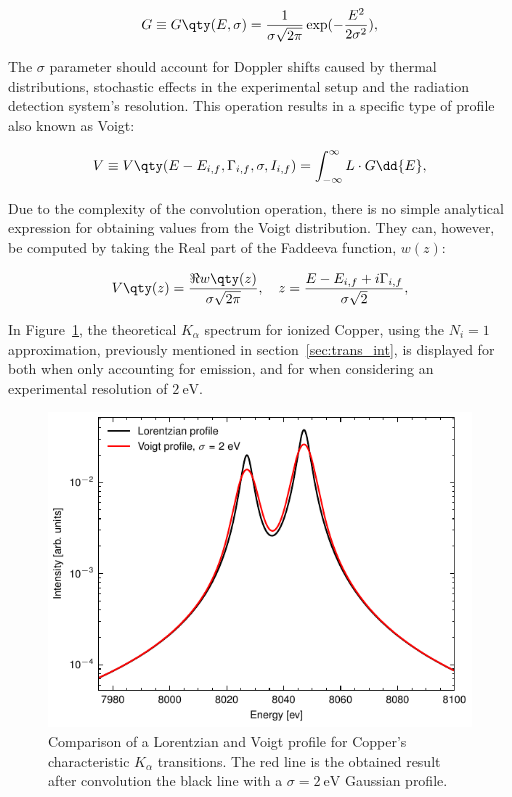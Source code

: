 \begin{equation}
    G\equiv G\qty(E,\sigma)=\frac{1}{\sigma\sqrt{2\pi}}\exp(-\frac{E^2}{2\sigma^2}),
    \label{eq:Gaussian}
\end{equation}

The $\sigma$ parameter should account for Doppler shifts caused by thermal distributions, stochastic effects in the experimental setup and the radiation detection system's resolution. This operation results in a specific type of profile also known as Voigt:

\begin{equation}
    V\equiv V\qty(E-E_{i,f},\Gamma_{i,f},\sigma,I_{i,f})=\int_{-\infty}^{\infty} L\cdot G\dd{E},
\end{equation}

Due to the complexity of the convolution operation, there is no simple analytical expression for obtaining values from the Voigt distribution. They can, however, be computed by taking the Real part of the Faddeeva function, $w(z)$:

\begin{equation}
    V\qty(z)= \frac{\Re{w\qty(z)}}{\sigma\sqrt{2\pi}},\quad z=\frac{E-E_{i,f} + i\Gamma_{i,f}}{\sigma\sqrt{2}},
\end{equation}

In Figure~\ref{fig:Lor_Voigt}, the theoretical $K_\alpha$ spectrum for ionized Copper, using the $N_i=1$ approximation, previously mentioned in section~\ref{sec:trans_int}, is displayed for both when only accounting for emission, and for when considering an experimental resolution of $2\ \si{\electronvolt}$.

\begin{figure}[h!]
    \centering
    \includegraphics[width=.6\linewidth]{Chapters/Figures/Chapter4/K_lorentz_voigt.pdf}
    \caption{Comparison of a Lorentzian and Voigt profile for Copper's characteristic $K_{\alpha}$ transitions. The red line is the obtained result after convolution the black line with a $\sigma=2\ \si{\electronvolt}$ Gaussian profile.}\label{fig:Lor_Voigt}
\end{figure}


